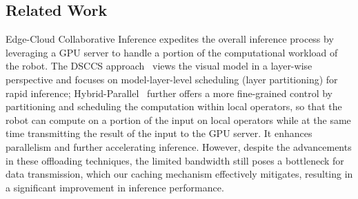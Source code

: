 \subsection{Related Work}
Edge-Cloud Collaborative Inference expedites the overall inference process by leveraging a GPU server to handle a portion of the computational workload of the robot. 
The DSCCS approach~\cite{liang2023dnn} views the visual model in a layer-wise perspective and focuses on model-layer-level scheduling (layer partitioning) for rapid inference;
Hybrid-Parallel~\cite{sun2024hybridparallel} further offers a more fine-grained control by partitioning and scheduling the computation within local operators, so that the robot can compute on a portion of the input on local operators while at the same time transmitting the result of the input to the GPU server.
It enhances parallelism and further accelerating inference. 
However, despite the advancements in these offloading techniques, the limited bandwidth still poses a bottleneck for data transmission, which our caching mechanism effectively mitigates, resulting in a significant improvement in inference performance.


